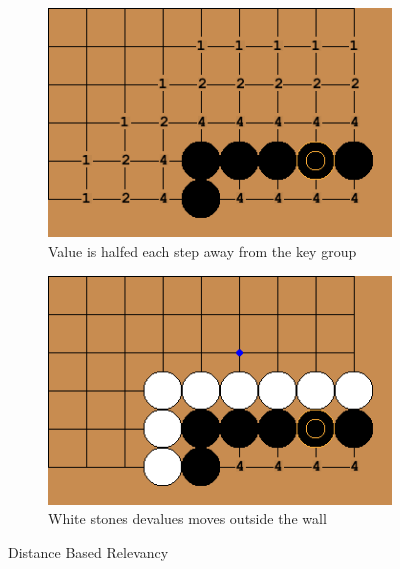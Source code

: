 \documentclass{l4proj}
\begin{document}
\begin{figure}[!ht]
\centering
\begin{subfigure}[b]{0.45\textwidth}
\centering
\includegraphics[width=\textwidth]{heur/4a.png}
\caption{Value is halfed each step away from the key group}
\label{fig:heur-4a}
\end{subfigure}
\begin{subfigure}[b]{0.45\textwidth}
\centering
\includegraphics[width=\textwidth]{heur/4b.png}
\caption{White stones devalues moves outside the wall}
\label{fig:heur-4b}
\end{subfigure}
\caption{Distance Based Relevancy}
\label{fig:heur-4}
\end{figure}
\end{document}
